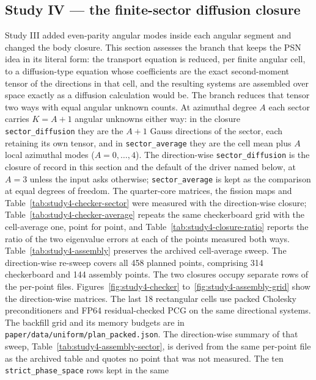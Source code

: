 \clearpage
\subsection{Study IV --- the finite-sector diffusion closure}\label{sec:study4}

\begin{sloppypar}
Study III added even-parity angular modes inside each angular segment and
changed the body closure. This section assesses the branch that keeps the
PSN idea in its literal form: the transport equation is reduced, per finite
angular cell, to a diffusion-type equation whose coefficients are the exact
second-moment tensor of the directions in that cell, and the resulting
systems are assembled over space exactly as a diffusion calculation would
be. The branch reduces that tensor two ways with equal angular unknown counts. At azimuthal degree
$A$ each sector carries $K{=}A{+}1$ angular unknowns either way: in the closure
\texttt{sector\_diffusion} they are the $A{+}1$ Gauss directions of the sector,
each retaining its own tensor, and in \texttt{sector\_average} they are the cell
mean plus $A$ local azimuthal modes ($A{=}0,\ldots,4$). The direction-wise
\texttt{sector\_diffusion} is the closure of record in this section and the
default of the driver named below, at $A{=}3$ unless the input asks otherwise;
\texttt{sector\_average} is kept as the comparison at equal degrees of freedom.
The quarter-core matrices, the fission maps and Table~\ref{tab:study4-checker-sector}
were measured with the direction-wise closure;
Table~\ref{tab:study4-checker-average} repeats the same checkerboard grid with the
cell-average one, point for point, and Table~\ref{tab:study4-closure-ratio} reports
the ratio of the two eigenvalue errors at each of the \StudyFourPairs{} points measured both ways.
Table~\ref{tab:study4-assembly} preserves the archived cell-average sweep.
The direction-wise re-sweep covers all 458 planned points, comprising 314 checkerboard
and 144 assembly points. The two closures occupy separate rows of the per-point files.
Figures~\ref{fig:study4-checker} to~\ref{fig:study4-assembly-grid} show the direction-wise
matrices. The last 18 rectangular cells use packed Cholesky preconditioners and
FP64 residual-checked PCG on the same directional systems. The backfill grid and
its memory budgets are in \texttt{paper/data/uniform/plan\_packed.json}.
The direction-wise summary of that sweep,
Table~\ref{tab:study4-assembly-sector}, is derived from the same per-point file as the
archived table and quotes no point that was not measured. The ten \texttt{strict\_phase\_space} rows kept in the same

\end{sloppypar}
